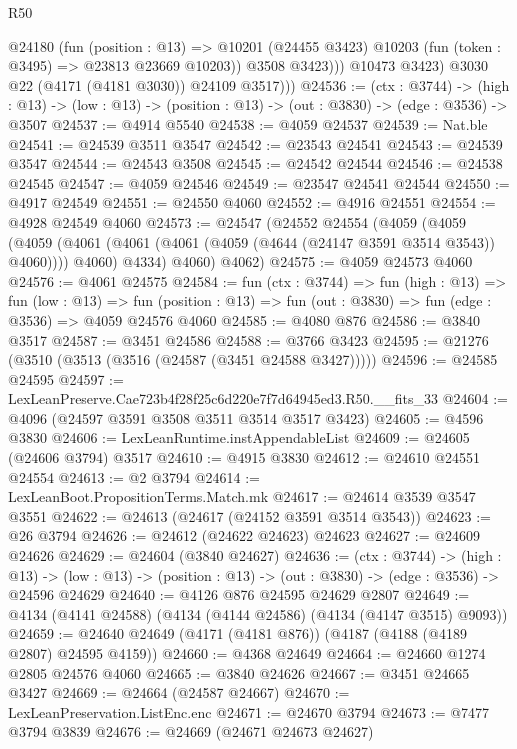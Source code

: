 \begin{lexlean}{R50}
\begin{coremodule}
                @24180
                  (fun (position : @13) =>
                  @10201 (@24455 @3423) @10203 (fun (token : @3495) => @23813 @23669 @10203))
                  @3508
                  @3423)))
            @10473
            @3423)
          @3030
          @22
          (@4171 (@4181 @3030))
          @24109
          @3517)))
@24536 := (ctx : @3744) ->
  (high : @13) -> (low : @13) -> (position : @13) -> (out : @3830) -> (edge : @3536) -> @3507
@24537 := @4914 @5540
@24538 := @4059 @24537
@24539 := Nat.ble
@24541 := @24539 @3511 @3547
@24542 := @23543 @24541
@24543 := @24539 @3547
@24544 := @24543 @3508
@24545 := @24542 @24544
@24546 := @24538 @24545
@24547 := @4059 @24546
@24549 := @23547 @24541 @24544
@24550 := @4917 @24549
@24551 := @24550 @4060
@24552 := @4916 @24551
@24554 := @4928 @24549 @4060
@24573 := @24547
    (@24552
      @24554
      (@4059
        (@4059
          (@4059 (@4061 (@4061 (@4061 (@4059 (@4644 (@24147 @3591 @3514 @3543)) @4060)))) @4060)
          @4334)
        @4060)
      @4062)
@24575 := @4059 @24573 @4060
@24576 := @4061 @24575
@24584 := fun (ctx : @3744) =>
  fun (high : @13) =>
  fun (low : @13) =>
  fun (position : @13) => fun (out : @3830) => fun (edge : @3536) => @4059 @24576 @4060
@24585 := @4080 @876
@24586 := @3840 @3517
@24587 := @3451 @24586
@24588 := @3766 @3423
@24595 := @21276 (@3510 (@3513 (@3516 (@24587 (@3451 @24588 @3427)))))
@24596 := @24585 @24595
@24597 := LexLeanPreserve.Cae723b4f28f25c6d220e7f7d64945ed3.R50.__fits_33
@24604 := @4096 (@24597 @3591 @3508 @3511 @3514 @3517 @3423)
@24605 := @4596 @3830
@24606 := LexLeanRuntime.instAppendableList
@24609 := @24605 (@24606 @3794) @3517
@24610 := @4915 @3830
@24612 := @24610 @24551 @24554
@24613 := @2 @3794
@24614 := LexLeanBoot.PropositionTerms.Match.mk
@24617 := @24614 @3539 @3547 @3551
@24622 := @24613 (@24617 (@24152 @3591 @3514 @3543))
@24623 := @26 @3794
@24626 := @24612 (@24622 @24623) @24623
@24627 := @24609 @24626
@24629 := @24604 (@3840 @24627)
@24636 := (ctx : @3744) ->
  (high : @13) ->
  (low : @13) -> (position : @13) -> (out : @3830) -> (edge : @3536) -> @24596 @24629
@24640 := @4126 @876 @24595 @24629 @2807
@24649 := @4134 (@4141 @24588) (@4134 (@4144 @24586) (@4134 (@4147 @3515) @9093))
@24659 := @24640 @24649 (@4171 (@4181 @876)) (@4187 (@4188 (@4189 @2807) @24595 @4159))
@24660 := @4368 @24649
@24664 := @24660 @1274 @2805 @24576 @4060
@24665 := @3840 @24626
@24667 := @3451 @24665 @3427
@24669 := @24664 (@24587 @24667)
@24670 := LexLeanPreservation.ListEnc.enc
@24671 := @24670 @3794
@24673 := @7477 @3794 @3839
@24676 := @24669 (@24671 @24673 @24627)

\end{coremodule}
\end{lexlean}
